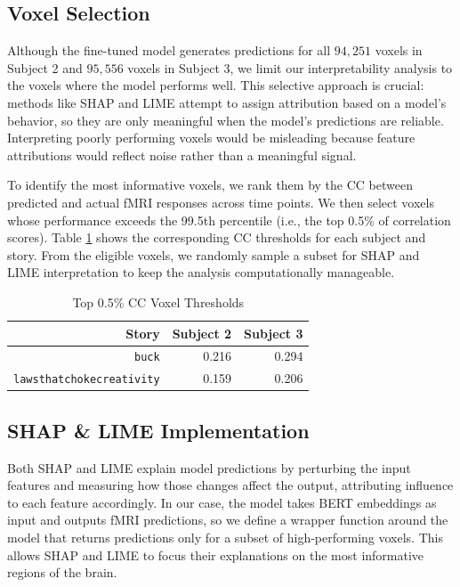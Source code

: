 \documentclass[10pt,letterpaper]{article}
\begin{document}
\subsection{Voxel Selection}

Although the fine-tuned model generates predictions for all $94{,}251$ voxels in Subject 2 and $95{,}556$ voxels in Subject 3, we limit our interpretability analysis to the voxels where the model performs well. This selective approach is crucial: methods like SHAP and LIME attempt to assign attribution based on a model's behavior, so they are only meaningful when the model's predictions are reliable. Interpreting poorly performing voxels would be misleading because feature attributions would reflect noise rather than a meaningful signal.

To identify the most informative voxels, we rank them by the CC between predicted and actual fMRI responses across time points. We then select voxels whose performance exceeds the 99.5th percentile (i.e., the top 0.5\% of correlation scores). Table \ref{tab:voxel_select} shows the corresponding CC thresholds for each subject and story. From the eligible voxels, we randomly sample a subset for SHAP and LIME interpretation to keep the analysis computationally manageable.


\begin{table}[ht]
    \centering
    \caption{Top 0.5\% CC Voxel Thresholds}
    \begin{tabular}{r|r|r}
        \toprule
        \textbf{Story}                   &  \textbf{Subject 2} & \textbf{Subject 3}\\
        \midrule
        \texttt{buck}                    &  0.216              & 0.294\\
        \hline
        \texttt{lawsthatchokecreativity} &  0.159              & 0.206\\
        \bottomrule
    \end{tabular}
    \label{tab:voxel_select}
\end{table}

\subsection{SHAP \& LIME Implementation}

Both SHAP and LIME explain model predictions by perturbing the input features and measuring how those changes affect the output, attributing influence to each feature accordingly. In our case, the model takes BERT embeddings as input and outputs fMRI predictions, so we define a wrapper function around the model that returns predictions only for a subset of high-performing voxels. This allows SHAP and LIME to focus their explanations on the most informative regions of the brain.
\end{document}

